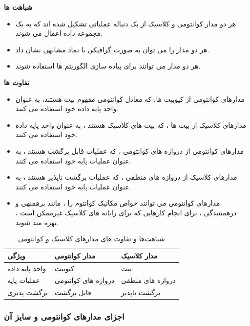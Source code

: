 \documentclass{book}
\begin{document}
\textbf{شباهت ها}

\begin{itemize}
	\item هر دو مدار کوانتومی و کلاسیک از یک دنباله عملیاتی تشکیل شده اند که به یک مجموعه داده اعمال می شوند.
	\item هر دو مدار را می توان به صورت گرافیکی با نماد مشابهی نشان داد.
	\item هر دو مدار می توانند برای پیاده سازی الگوریتم ها استفاده شوند.
\end{itemize}

\textbf{تفاوت ها}

\begin{itemize}
	\item مدارهای کوانتومی از کیوبیت ها، که معادل کوانتومی مفهوم بیت هستند، به عنوان واحد پایه داده خود استفاده می کنند. 
	\item مدارهای کلاسیک از بیت ها ، که بیت های کلاسیک هستند ، به عنوان واحد پایه داده خود استفاده می کنند.
	\item مدارهای کوانتومی از دروازه های کوانتومی ، که عملیات قابل برگشت هستند ، به عنوان عملیات پایه خود استفاده می کنند.
	\item  مدارهای کلاسیک از دروازه های منطقی ، که عملیات برگشت ناپذیر هستند ، به عنوان عملیات پایه خود استفاده می کنند.
	\item مدارهای کوانتومی می توانند خواص مکانیک کوانتوم را ، مانند برهمنهی و درهمتنیدگی ، برای انجام کارهایی که برای رایانه های کلاسیک غیرممکن است ، بهره مند شوند.
\end{itemize}



\begin{table}[ht]
	\centering
	\begin{tabular}{|p{100pt}|p{100pt}|p{100pt}|}
		\hline
		ویژگی & مدار کوانتومی &مدار کلاسیک \\
		\hline
		واحد پایه داده & کیوبیت & بیت \\
		\hline
	      عملیات پایه & دروازه های کوانتومی & دروازه های منطقی \\
		\hline
		برگشت پذیری & قابل برگشت & برگشت ناپذیر \\
		\hline
	\end{tabular}
	\caption{شباهت‌ها و تفاوت های مدارهای کلاسیک و کوانتومی}
\end{table}



\subsubsection{اجزای مدار‌های کوانتومی و سایز آن }
\end{document}
